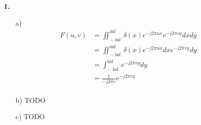 \documentclass[a4paper,11pt]{article}
\author{\authorinfotitle}
\title{\titleinfo}
\date{\today}
\begin{document}
	\maketitle
	\begin{enumerate}
		\item[\textbf{1.}]
			\begin{enumerate}
				\item[a)]
					\begin{align*}
					F(u,v) &= \iint_{-\inf}^{\inf}\delta(x)e^{-j2\pi ux}e^{-j2\pi vy}dx dy\\
					&=\iint_{-\inf}^{\inf}\delta(x)e^{-j2\pi ux}dx e^{-j2\pi vy}dy\\
					&=\int_{-\inf}^{\inf} e^{-j2\pi vy}dy\\
					&= \frac{1}{-j2\pi v} e^{-j2\pi vy}\\
					\end{align*}
				\item[b)]
					TODO
				\item[c)]
					TODO
			\end{enumerate}
	\end{enumerate}
\end{document}
